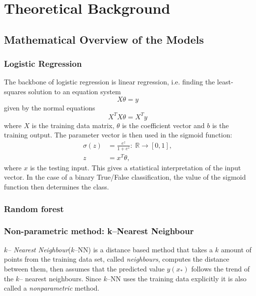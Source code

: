 \section{Theoretical Background}


\subsection{Mathematical Overview of the Models}
\subsubsection{Logistic Regression}
The backbone of logistic regression is linear regression, i.e. finding the least-squares solution to an equation system \begin{equation}
    X\theta = y
\end{equation}
given by the normal equations \begin{equation}
    X^TX \theta = X^Ty
\end{equation}
where $X$ is the training data matrix, $\theta$ is the coefficient vector and $b$ is the training output. The parameter vector is then used in the sigmoid function: \begin{align}
    \sigma(z) &= \frac{e^{z}}{1+e^{z}}: \; \mathbb{R}\to [0,1],\\
    z &= x^T \theta,
\end{align}
where $x$ is the testing input. This gives a statistical interpretation of the input vector. In the case of a binary True/False classification, the value of the sigmoid function then determines the class.

\subsubsection{Random forest}
    \subsubsection{Non-parametric method: k--Nearest Neighbour}
        \emph{$k$-- Nearest Neighbour}($k$--NN) is a distance based method that takes a $k$ amount of points from the training data set, called \emph{neighbours}, computes the distance between them, then assumes that the predicted value $\hat{y}(x_{*})$ follows the trend of the $k$-- nearest neighbours. Since $k$--NN uses the training data explicitly it is also called a \emph{nonparametric} method.
    
